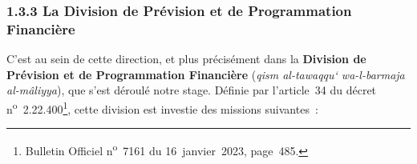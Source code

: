 \subsubsection*{1.3.3 \quad La Division de Pr\'evision et de Programmation Financi\`ere}

C'est au sein de cette direction, et plus pr\'ecis\'ement dans la \textbf{Division de Pr\'evision et de Programmation Financi\`ere} (\textit{qism al-tawaqqu\textquoteleft{} wa-l-barmaja al-m\^aliyya}), que s'est d\'eroul\'e notre stage. D\'efinie par l'article~34 du d\'ecret n\textsuperscript{o}~2.22.400\footnote{Bulletin Officiel n\textsuperscript{o}~7161 du 16~janvier~2023, page~485.}, cette division est investie des missions suivantes~:

